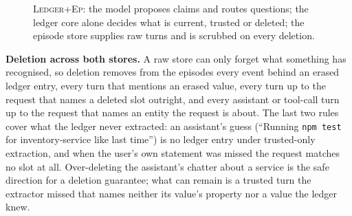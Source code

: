 \documentclass[10pt,conference]{IEEEtran}
\newcommand{\hyb}{\textsc{Ledger+Ep}}
\begin{document}
\begin{figure}[t]
\centering
{}
\caption{\hyb{}: the model proposes claims and routes questions; the ledger
core alone decides what is current, trusted or deleted; the episode store
supplies raw turns and is scrubbed on every deletion.}
\label{fig:arch}
\end{figure}

\textbf{Deletion across both stores.} A raw store can only forget what
something has recognised, so deletion removes from the episodes every event
behind an erased ledger entry, every turn that mentions an erased value,
every turn up to the request that names a deleted slot outright, and every
assistant or tool-call turn up to the request that names an entity the
request is about. The last two rules cover what the ledger never extracted:
an assistant's guess (``Running \texttt{npm test} for inventory-service like
last time'') is no ledger entry under trusted-only extraction, and when the
user's own statement was missed the request matches no slot at all.
Over-deleting the assistant's chatter about a service is the safe direction
for a deletion guarantee; what can remain is a trusted turn the extractor
missed that names neither its value's property nor a value the ledger knew.
\end{document}
